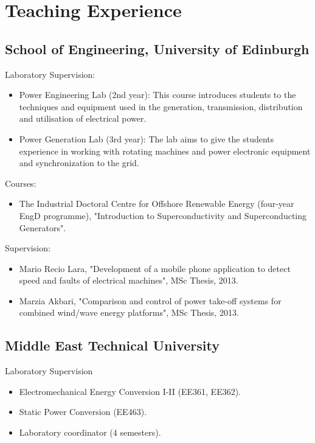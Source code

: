 \documentclass[a4paper,12pt]{article}
\begin{document}
\section{Teaching Experience}

\subsection{School of Engineering, University of Edinburgh}

Laboratory Supervision:
\begin{itemize}
\item Power Engineering Lab (2nd year): This course introduces students to the techniques and equipment used in the generation, transmission, distribution and utilisation of electrical power.
\item Power Generation Lab (3rd year): The lab aims to give the students experience in working with rotating machines and power electronic equipment and synchronization to the grid. 

\end{itemize}

Courses:
\begin{itemize}
\item The Industrial Doctoral Centre for Offshore Renewable Energy (four-year EngD programme), "Introduction to Superconductivity and Superconducting Generators".
\end{itemize}


Supervision:
\begin{itemize}
\item Mario Recio Lara, "Development of a mobile phone application to detect speed and faults of electrical machines", MSc Thesis, 2013.
\item Marzia Akbari, "Comparison and control of power take-off systems for combined wind/wave energy platforms", MSc Thesis, 2013.
\end{itemize}


\subsection{Middle East Technical University}
Laboratory Supervision
\begin{itemize}
\item Electromechanical Energy Conversion I-II (EE361, EE362).
\item Static Power Conversion (EE463).
\item Laboratory coordinator (4 semesters). 
\end{itemize}
\end{document}
